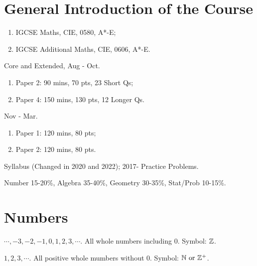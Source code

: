 \documentclass[8pt]{article}
\author{\Author}
\title{\Title}
\date{\Date}
\begin{document}
	\maketitle

	\tableofcontents

	\section{General Introduction of the Course}
		\intr \intrword{(Course Structure)}
		
		\begin{enumerate}[label=\intrword{(\arabic*)}]
			\item IGCSE Maths, CIE, 0580, A*-E;
			\item IGCSE Additional Maths, CIE, 0606, A*-E.
		\end{enumerate}

		\intr {} Core and Extended, Aug - Oct.
		
		\begin{enumerate}[label=\intrword{(\arabic*)}]
			\item Paper 2: 90 mins, 70 pts, 23 Short Qs;
			\item Paper 4: 150 mins, 130 pts, 12 Longer Qs.
		\end{enumerate}

		\intr {} Nov - Mar.
		
		\begin{enumerate}[label=\intrword{(\arabic*)}]
			\item Paper 1: 120 mins, 80 pts;
			\item Paper 2: 120 mins, 80 pts.
		\end{enumerate}

		\intr {} Syllabus (Changed in 2020 and 2022); 2017- Practice Problems.

		\intr {} Number 15-20\%, Algebra 35-40\%, Geometry 30-35\%, Stat/Prob 10-15\%.

	\section{Numbers}
		\defi {} \(\cdots, -3, -2, -1, 0, 1, 2, 3, \cdots\). All whole numbers including \(0\). Symbol: \(\mathbb{Z}\).

		\defi {} \(1, 2, 3, \cdots\). All positive whole mumbers without \(0\). Symbol: \(\mathbb{N} \text{ or } \mathbb{Z}^{+}\).
\end{document}

